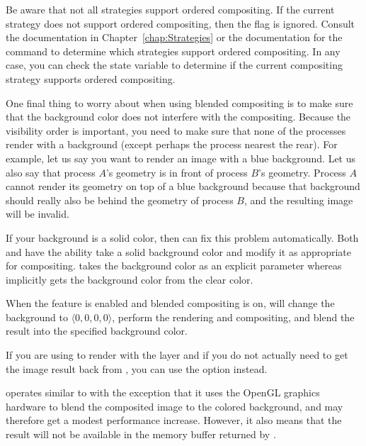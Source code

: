 Be aware that not all strategies support ordered compositing.  If the
current strategy does not support ordered compositing, then the
 flag is ignored.  Consult the
documentation in Chapter~\ref{chap:Strategies} or the documentation for the
 command to determine which strategies support ordered
compositing.  In any case, you can check the
 state variable to determine if
the current compositing strategy supports ordered compositing.



One final thing to worry about when using blended compositing is to make
sure that the background color does not interfere with the compositing.
Because the visibility order is important, you need to make sure that none
of the processes render with a background (except perhaps the process
nearest the rear).  For example, let us say you want to render an image
with a blue background.  Let us also say that process $A$'s geometry is in
front of process $B$'s geometry.  Process $A$ cannot render its geometry on
top of a blue background because that background should really also be
behind the geometry of process $B$, and the resulting image will be
invalid.

If your background is a solid color, then \IceT can fix this problem
automatically.  Both  and  have
the ability take a solid background color and modify it as appropriate for
compositing.   takes the background color as an
explicit parameter whereas  implicitly gets the
background color from the \OpenGL clear color.

When the  feature is enabled and
blended compositing is on, \IceT will change the background to $\langle 0,
0, 0, 0 \rangle$, perform the rendering and compositing, and blend the
result into the specified background color.

If you are using  to render with the \OpenGL layer
and if you do not actually need to get the image result back from
, you can use the
 option instead.

 operates similar to
 with the exception that it uses
the OpenGL graphics hardware to blend the composited image to the colored
background, and may therefore get a modest performance increase.  However,
it also means that the result will not be available in the memory buffer
returned by .

